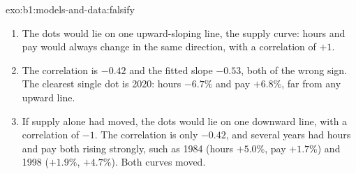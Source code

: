 \begin{solution}{exo:b1:models-and-data:falsify}
\begin{enumerate}
  \item The dots would lie on one upward-sloping line, the supply curve:
    hours and pay would always change in the same direction, with a
    correlation of $+1$.
  \item The correlation is $-0.42$ and the fitted slope $-0.53$, both of
    the wrong sign. The clearest single dot is 2020: hours $-6.7\%$ and pay
    $+6.8\%$, far from any upward line.
  \item If supply alone had moved, the dots would lie on one downward line,
    with a correlation of $-1$. The correlation is only $-0.42$, and several
    years had hours and pay both rising strongly, such as 1984 (hours
    $+5.0\%$, pay $+1.7\%$) and 1998 ($+1.9\%$, $+4.7\%$). Both curves moved.
\end{enumerate}
\end{solution}

